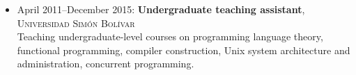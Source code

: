\documentclass{res}
\begin{document}
\begin{resume}
\begin{itemize}[leftmargin=-0.3in]

    \item
      April 2011--December 2015: \textbf{Undergraduate teaching assistant}, \textsc{Universidad Sim\'on Bol\'{\i}var}
      \\ \small{Teaching undergraduate-level courses on programming language theory, functional programming, compiler construction, Unix system architecture and administration, concurrent programming.}

  \end{itemize}

\end{resume}
\end{document}
